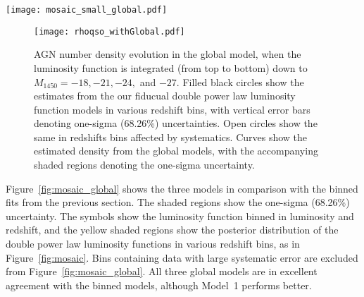 \documentclass[fleqn,usenatbib]{mnras}
\begin{document}
\begin{figure*}
  \begin{center}
    \texttt{[image: mosaic\_small\_global.pdf]}
  \end{center}
  \caption{Luminosity function estimates from $z=0.6$ to $6.5$.
    Similar to Figure~\ref{fig:mosaic}, the symbols show our inferred
    binned luminosity functions.  In each redshift bin, yellow curves
    show our fiducial double power law luminosity function model in
    that redshift bin.  Other curves show the three global evolution
    models.  Shaded regions show the one-sigma (68.26\%)
    uncertainties.}
  \label{fig:mosaic_global}
\end{figure*}

\begin{figure}
  \begin{center}
    \texttt{[image: rhoqso\_withGlobal.pdf]}
  \end{center}
  \caption{AGN number density evolution in the global model, when the
    luminosity function is integrated (from top to bottom) down to
    $M_\mathrm{1450}=-18, -21, -24,$ and $-27$.  Filled black circles
    show the estimates from the our fiducual double power law
    luminosity function models in various redshift bins, with vertical
    error bars denoting one-sigma (68.26\%) uncertainties.  Open
    circles show the same in redshifts bins affected by systematics.
    Curves show the estimated density from the global models, with the
    accompanying shaded regions denoting the one-sigma uncertainty. }
  \label{fig:rhoqso}
\end{figure}

Figure~\ref{fig:mosaic_global}
shows the three
models in comparison
with the binned fits from the previous section.  The shaded regions
show the one-sigma (68.26\%) uncertainty.  The symbols show the
luminosity function binned in luminosity and redshift, and the yellow
shaded regions show the posterior distribution of the double power law
luminosity functions in various redshift bins, as in
Figure~\ref{fig:mosaic}.  Bins containing data with large systematic
error are excluded from Figure~\ref{fig:mosaic_global}.  All three
global models are in excellent agreement with the binned models,
although Model~1 performs better.
\end{document}

